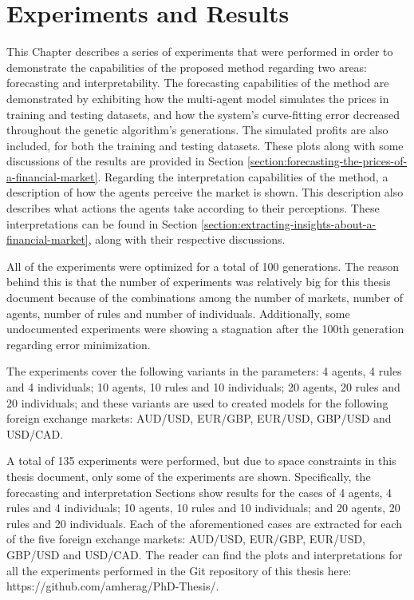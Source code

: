 \chapter{Experiments and Results}
\label{chapter:experiments-and-results}

This Chapter describes a series of experiments that were performed in order to
demonstrate the capabilities of the proposed method regarding two areas:
forecasting and interpretability. The forecasting capabilities of the method are
demonstrated by exhibiting how the multi-agent model simulates the prices in
training and testing datasets, and how the system's curve-fitting error
decreased throughout the genetic algorithm's generations. The simulated profits
are also included, for both the training and testing datasets. These plots along
with some discussions of the results are provided in Section
\ref{section:forecasting-the-prices-of-a-financial-market}. Regarding the
interpretation capabilities of the method, a description of how the agents
perceive the market is shown. This description also describes what actions the
agents take according to their perceptions. These interpretations can be found
in Section \ref{section:extracting-insights-about-a-financial-market}, along
with their respective discussions.

All of the experiments were optimized for a total of 100 generations. The reason
behind this is that the number of experiments was relatively big for this
thesis document because of the combinations among the number of markets, number
of agents, number of rules and number of individuals. Additionally, some
undocumented experiments were showing a stagnation after the 100th generation
regarding error minimization.

The experiments cover the following variants in the parameters: 4 agents, 4
rules and 4 individuals; 10 agents, 10 rules and 10 individuals; 20 agents, 20
rules and 20 individuals; and these variants are used to created models for the
following foreign exchange markets: AUD/USD, EUR/GBP, EUR/USD, GBP/USD and
USD/CAD.

A total of 135 experiments were performed, but due to space constraints in this
thesis document, only some of the experiments are shown. Specifically, the
forecasting and interpretation Sections show results for the cases of 4 agents,
4 rules and 4 individuals; 10 agents, 10 rules and 10 individuals; and 20
agents, 20 rules and 20 individuals. Each of the aforementioned cases are
extracted for each of the five foreign exchange markets: AUD/USD, EUR/GBP,
EUR/USD, GBP/USD and USD/CAD. The reader can find the plots and interpretations
for all the experiments performed in the Git repository of this thesis here:
https://github.com/amherag/PhD-Thesis/.

